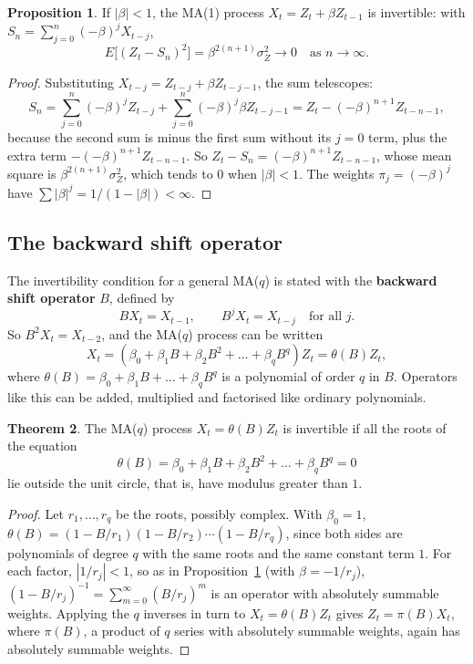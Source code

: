 \documentclass[11pt,a4paper]{article}
\theoremstyle{definition}
\newtheorem{thm}{Theorem}[subsection]
\newtheorem{prop}[thm]{Proposition}
\begin{document}
\begin{prop}\label{prop:ma1-invert}
If $|\beta| < 1$, the MA(1) process $X_t = Z_t + \beta Z_{t-1}$ is invertible: with $S_n = \sum_{j=0}^n(-\beta)^jX_{t-j}$,
\[
E\bigl[(Z_t - S_n)^2\bigr] = \beta^{2(n+1)}\sigma_Z^2 \to 0 \quad\text{as } n \to \infty .
\]
\end{prop}

\begin{proof}
Substituting $X_{t-j} = Z_{t-j} + \beta Z_{t-j-1}$, the sum telescopes:
\[
S_n = \sum_{j=0}^n(-\beta)^jZ_{t-j} + \sum_{j=0}^n(-\beta)^j\beta Z_{t-j-1} = Z_t - (-\beta)^{n+1}Z_{t-n-1} ,
\]
because the second sum is minus the first sum without its $j = 0$ term, plus the extra term $-(-\beta)^{n+1}Z_{t-n-1}$. So $Z_t - S_n = (-\beta)^{n+1}Z_{t-n-1}$, whose
mean square is $\beta^{2(n+1)}\sigma_Z^2$, which tends to $0$ when $|\beta| < 1$. The weights $\pi_j = (-\beta)^j$ have $\sum|\beta|^j = 1/(1 - |\beta|) < \infty$.
\end{proof}

\subsection{The backward shift operator}
The invertibility condition for a general MA($q$) is stated with the \textbf{backward shift operator} $B$, defined by
\[
BX_t = X_{t-1} , \qquad B^jX_t = X_{t-j} \quad\text{for all } j .
\]
So $B^2X_t = X_{t-2}$, and the MA($q$) process can be written
\[
X_t = (\beta_0 + \beta_1B + \beta_2B^2 + \dots + \beta_qB^q)Z_t = \theta(B)Z_t ,
\]
where $\theta(B) = \beta_0 + \beta_1B + \dots + \beta_qB^q$ is a polynomial of order $q$ in $B$. Operators like this can be added, multiplied and
factorised like ordinary polynomials.

\begin{thm}\label{thm:ma-invertible}
The MA($q$) process $X_t = \theta(B)Z_t$ is invertible if all the roots of the equation
\[
\theta(B) = \beta_0 + \beta_1B + \beta_2B^2 + \dots + \beta_qB^q = 0
\]
lie outside the unit circle, that is, have modulus greater than $1$.
\end{thm}

\begin{proof}
Let $r_1, \dots, r_q$ be the roots, possibly complex. With $\beta_0 = 1$, $\theta(B) = (1 - B/r_1)(1 - B/r_2)\cdots(1 - B/r_q)$, since both sides are
polynomials of degree $q$ with the same roots and the same constant term $1$. For each factor, $|1/r_j| < 1$, so as in
Proposition~\ref{prop:ma1-invert} (with $\beta = -1/r_j$), $(1 - B/r_j)^{-1} = \sum_{m=0}^\infty(B/r_j)^m$ is an operator with absolutely summable weights.
Applying the $q$ inverses in turn to $X_t = \theta(B)Z_t$ gives $Z_t = \pi(B)X_t$, where $\pi(B)$, a product of $q$ series with absolutely
summable weights, again has absolutely summable weights.
\end{proof}
\end{document}
